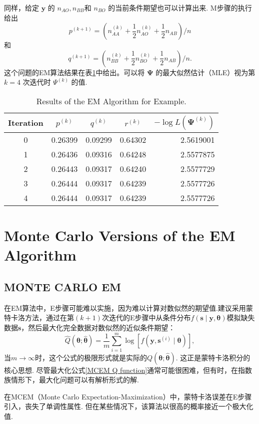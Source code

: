 \documentclass[UTF8,12pt]{ctexart}
\numberwithin{equation}{section}%
\begin{document}
	同样，给定 \(\boldsymbol{y}\) 的 \(n_{AO}, n_{BB}\)和 \(n_{BO}\) 的当前条件期望也可以计算出来. M步骤的执行给出
	\[
	p^{(k+1)}=\left(n_{AA}^{(k)}+\frac{1}{2} n_{AO}^{(k)}+\frac{1}{2} n_{AB}\right) / n
	\]
	和
	\[
	q^{(k+1)}=\left(n_{BB}^{(k)}+\frac{1}{2} n_{BO}^{(k)}+\frac{1}{2} n_{AB}\right) / n .
	\]
	这个问题的EM算法结果在表\ref{EM results for cell}中给出。可以将 \(\boldsymbol{\Psi}\) 的最大似然估计（MLE）视为第 \(k=4\) 次迭代时 \(\Psi^{(k)}\) 的值.
	
	\begin{table}[H]
		\caption{Results of the EM Algorithm for Example.}
		\label{EM results for cell}
		\centering 
		\begin{tabular}{ccccr}
			\hline Iteration & $p^{(k)}$ & $q^{(k)}$ & $r^{(k)}$ & $-\log L\left(\boldsymbol{\Psi}^{(k)}\right)$ \\
			\hline 0 & 0.26399 & 0.09299 & 0.64302 & 2.5619001 \\
			1 & 0.26436 & 0.09316 & 0.64248 & 2.5577875 \\
			2 & 0.26443 & 0.09317 & 0.64240 & 2.5577729 \\
			3 & 0.26444 & 0.09317 & 0.64239 & 2.5577726 \\
			4 & 0.26444 & 0.09317 & 0.64239 & 2.5577726 \\
			\hline
		\end{tabular}
	\end{table}
	
	
	\section{Monte Carlo Versions of the EM Algorithm}
	\subsection{MONTE CARLO EM}
	在EM算法中，E步骤可能难以实施，因为难以计算对数似然的期望值.\citet{wei1990monte,wei1990posterior}建议采用蒙特卡洛方法，通过在第$(k+1)$次迭代的E步骤中从条件分布$ f(\mathbf{s} \mid \mathbf{y}, \boldsymbol{\theta}) $模拟缺失数据$\mathbf{s}$，然后最大化完全数据对数似然的近似条件期望：
	\begin{equation}\label{MCEM Q function}
		\hat{Q}\left(\boldsymbol{\theta};\hat{\boldsymbol{\theta}} \right)=\frac{1}{m} \sum_{i=1}^{m} \log \left[f\left(\mathbf{y}, \mathbf{s}^{(i)} \mid \boldsymbol{\theta}\right)\right],
	\end{equation}
	当$m \rightarrow \infty$时，这个公式的极限形式就是实际的$Q\left(\boldsymbol{\theta};\hat{\boldsymbol{\theta}} \right)$. 这正是蒙特卡洛积分的核心思想. 尽管最大化公式\eqref{MCEM Q function}通常可能很困难，但有时，在指数族情形下，最大化问题可以有解析形式的解. 
	\begin{marker}
		在MCEM（Monte Carlo Expectation-Maximization）中，蒙特卡洛误差在E步骤引入，丧失了单调性属性. 但在某些情况下，该算法以很高的概率接近一个极大化值.
	\end{marker}
\end{document}
